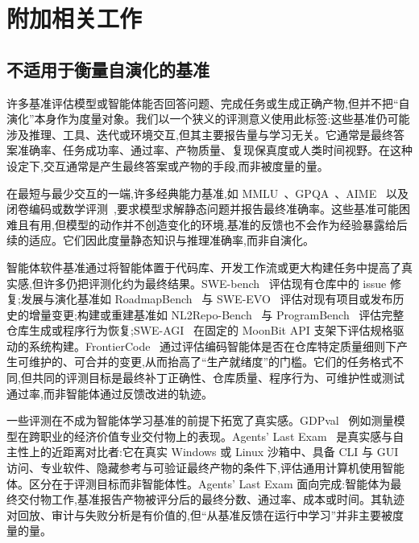 \section{附加相关工作}
\label{app:related}

\subsection{不适用于衡量自演化的基准}
\label{app:related-nosel}

许多基准评估模型或智能体能否回答问题、完成任务或生成正确产物,但并不把``自演化''本身作为度量对象。我们以一个狭义的评测意义使用此标签:这些基准仍可能涉及推理、工具、迭代或环境交互,但其主要报告量与学习无关。它通常是最终答案准确率、任务成功率、通过率、产物质量、复现保真度或人类时间视野。在这种设定下,交互通常是产生最终答案或产物的手段,而非被度量的量。

在最短与最少交互的一端,许多经典能力基准,如 MMLU~\cite{hendrycks2021mmlu}、GPQA~\cite{rein2023gpqa}、AIME~\cite{maa2026aime} 以及闭卷编码或数学评测~\cite{chen2021humaneval,hendrycks2021math},要求模型求解静态问题并报告最终准确率。这些基准可能困难且有用,但模型的动作并不创造变化的环境,基准的反馈也不会作为经验暴露给后续的适应。它们因此度量静态知识与推理准确率,而非自演化。

智能体软件基准通过将智能体置于代码库、开发工作流或更大构建任务中提高了真实感,但许多仍把评测化约为最终结果。SWE-bench~\cite{jimenez2024swebench} 评估现有仓库中的 issue 修复;发展与演化基准如 RoadmapBench~\cite{xu2026roadmapbench} 与 SWE-EVO~\cite{thai2025sweevo} 评估对现有项目或发布历史的增量变更;构建或重建基准如 NL2Repo-Bench~\cite{ding2025nl2repo} 与 ProgramBench~\cite{yang2026programbench} 评估完整仓库生成或程序行为恢复;SWE-AGI~\cite{zhang2026sweagi} 在固定的 MoonBit API 支架下评估规格驱动的系统构建。FrontierCode~\cite{lu2026frontiercode} 通过评估编码智能体是否在仓库特定质量细则下产生可维护的、可合并的变更,从而抬高了``生产就绪度''的门槛。它们的任务格式不同,但共同的评测目标是最终补丁正确性、仓库质量、程序行为、可维护性或测试通过率,而非智能体通过反馈改进的轨迹。

一些评测在不成为智能体学习基准的前提下拓宽了真实感。GDPval~\cite{patwardhan2025gdpval} 例如测量模型在跨职业的经济价值专业交付物上的表现。Agents' Last Exam~\cite{sun2026agents} 是真实感与自主性上的近距离对比者:它在真实 Windows 或 Linux 沙箱中、具备 CLI 与 GUI 访问、专业软件、隐藏参考与可验证最终产物的条件下,评估通用计算机使用智能体。区分在于评测目标而非智能体性。Agents' Last Exam 面向完成:智能体为最终交付物工作,基准报告产物被评分后的最终分数、通过率、成本或时间。其轨迹对回放、审计与失败分析是有价值的,但``从基准反馈在运行中学习''并非主要被度量的量。

